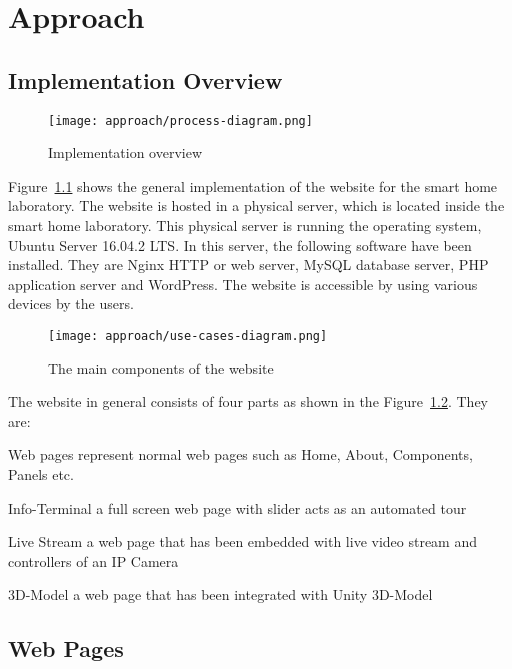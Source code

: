 \chapter{Approach}

\section{Implementation Overview}

\begin{figure}[ht]
\caption{Implementation overview}
\label{fig:implementation-overview}
\centering
\texttt{[image: approach/process-diagram.png]}
\end{figure}

Figure~\ref{fig:implementation-overview} shows the general implementation of the website for the smart home laboratory. The website is hosted in a physical server, which is located inside the smart home laboratory. This physical server is running the operating system, Ubuntu Server 16.04.2 LTS. In this server, the following software have been installed. They are Nginx HTTP or web server, MySQL database server, PHP application server and WordPress. The website is accessible by using various devices by the users.

\begin{figure}
\caption{The main components of the website}
\label{fig:use-cases-diagram}
\centering
\texttt{[image: approach/use-cases-diagram.png]}
\end{figure}

The website in general consists of four parts as shown in the Figure~\ref{fig:use-cases-diagram}. They are:
\begin{description*}
\item[Web pages] represent normal web pages such as Home, About, Components, Panels etc.
\item[Info-Terminal] a full screen web page with slider acts as an automated tour
\item[Live Stream] a web page that has been embedded with live video stream and controllers of an IP Camera
\item[3D-Model] a web page that has been integrated with Unity 3D-Model
\end{description*}

\section{Web Pages}
